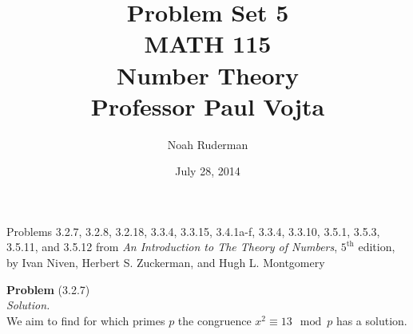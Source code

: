 \documentclass[12 pt]{amsart}
\begin{document}
\graphicspath{{/home/noah/Documents/MATH\_115\_Number\_Theory/}}

\allowdisplaybreaks
\title
[Problem Set 5]
{Problem Set 5 \\
MATH 115 \\
Number Theory \\
Professor Paul Vojta}

\author{Noah Ruderman}

\date{ July 28, 2014}

\maketitle
\begin{center}
	Problems 3.2.7, 3.2.8, 3.2.18, 3.3.4, 3.3.15, 3.4.1a-f, 3.3.4, 3.3.10, 3.5.1, 3.5.3, 3.5.11, and 3.5.12 
	from \emph{An Introduction to The Theory of Numbers}, 
	$5^{\text{th}}$ edition,
	by Ivan Niven, Herbert S. Zuckerman, and Hugh L. Montgomery 
\end{center}

\newpage
\phantom{\quad} \vfill
\noindent
\textbf{Problem} (3.2.7) \\[4ex]
\emph{Solution.} \\[2ex]
  We aim to find for which primes $p$ the congruence
  $x^2 \equiv 13 \mod p$
  has a solution.
\end{document}
